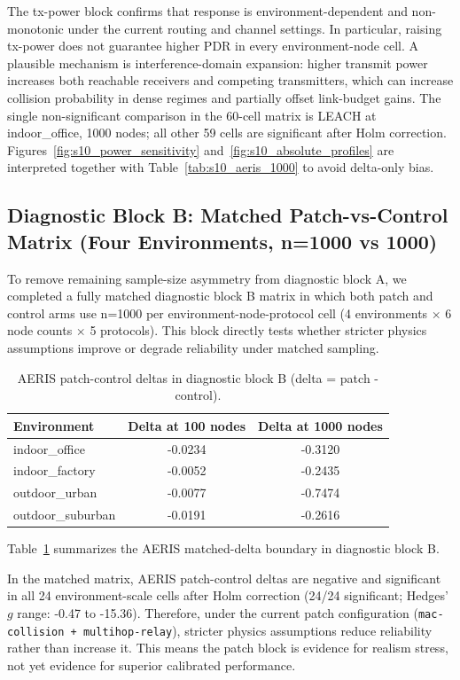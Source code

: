 ﻿\documentclass[sensors,article,submit,moreauthors,pdftex]{Definitions/mdpi}
\begin{document}
The tx-power block confirms that response is environment-dependent and non-monotonic under the current routing and channel settings. In particular, raising tx-power does not guarantee higher PDR in every environment-node cell. A plausible mechanism is interference-domain expansion: higher transmit power increases both reachable receivers and competing transmitters, which can increase collision probability in dense regimes and partially offset link-budget gains. The single non-significant comparison in the 60-cell matrix is LEACH at indoor\_office, 1000 nodes; all other 59 cells are significant after Holm correction.
Figures~\ref{fig:s10_power_sensitivity} and~\ref{fig:s10_absolute_profiles} are interpreted together with Table~\ref{tab:s10_aeris_1000} to avoid delta-only bias.

\subsection{Diagnostic Block B: Matched Patch-vs-Control Matrix (Four Environments, n=1000 vs 1000)}
To remove remaining sample-size asymmetry from diagnostic block A, we completed a fully matched diagnostic block B matrix in which both patch and control arms use n=1000 per environment-node-protocol cell (4 environments $\times$ 6 node counts $\times$ 5 protocols). This block directly tests whether stricter physics assumptions improve or degrade reliability under matched sampling.

\begin{table}[H]
\caption{AERIS patch-control deltas in diagnostic block B (delta = patch - control).}
\label{tab:s11_aeris_delta}
\centering
\begin{tabular}{lcc}
\toprule
Environment & Delta at 100 nodes & Delta at 1000 nodes \\
\midrule
indoor\_office    & -0.0234 & -0.3120 \\
indoor\_factory   & -0.0052 & -0.2435 \\
outdoor\_urban    & -0.0077 & -0.7474 \\
outdoor\_suburban & -0.0191 & -0.2616 \\
\bottomrule
\end{tabular}
\end{table}

Table~\ref{tab:s11_aeris_delta} summarizes the AERIS matched-delta boundary in diagnostic block B.

In the matched matrix, AERIS patch-control deltas are negative and significant in all 24 environment-scale cells after Holm correction (24/24 significant; Hedges' $g$ range: -0.47 to -15.36). Therefore, under the current patch configuration (\texttt{mac-collision + multihop-relay}), stricter physics assumptions reduce reliability rather than increase it. This means the patch block is evidence for realism stress, not yet evidence for superior calibrated performance.
\end{document}
